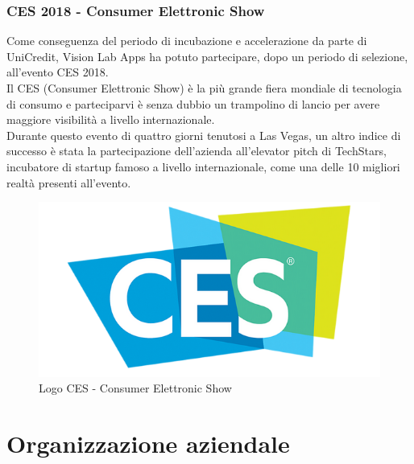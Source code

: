     \subsubsection*{CES 2018 - Consumer Elettronic Show}
      Come conseguenza del periodo di incubazione e accelerazione da parte di UniCredit, Vision Lab Apps ha potuto partecipare, dopo un periodo di selezione, all'evento CES 2018.\\
      Il CES (Consumer Elettronic Show) è la più grande fiera mondiale di tecnologia di consumo e parteciparvi è senza dubbio un trampolino di lancio per avere maggiore visibilità a livello internazionale.\\
      Durante questo evento di quattro giorni tenutosi a Las Vegas, un altro indice di successo è stata la partecipazione dell'azienda all'elevator pitch di TechStars, incubatore di startup famoso a livello internazionale, come una delle 10 migliori realtà presenti all'evento.
      \begin{figure}[h]
        \centering
        \includegraphics[scale=0.3]{immagini/ces.png}
        \caption{Logo CES - Consumer Elettronic Show}
        \label{logoCes}
      \end{figure}
  \newpage
  \section{Organizzazione aziendale}
